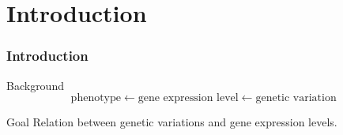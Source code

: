 \section{Introduction}
\begin{frame}
\sectionpage
\end{frame}

\begin{frame}
    \frametitle{Introduction}
    \begin{block}{Background} 
      \begin{equation*}
        \text{phenotype} \leftarrow 
        \text{gene expression level} \leftarrow 
        \text{genetic variation }
      \end{equation*}
	\end{block}

%      
	\begin{block}{Goal}
		Relation between genetic variations and gene expression levels.
	\end{block}

    
\end{frame}

		


